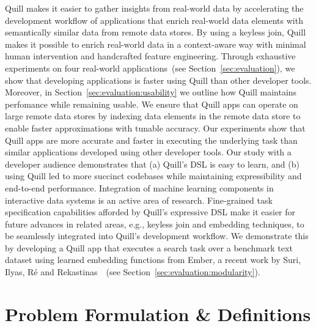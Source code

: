 \documentclass[11pt]{article}
\begin{document}
Quill makes it easier to gather insights from real-world data by accelerating the development workflow of applications that enrich real-world data elements with semantically similar data from remote data stores. By using a keyless join, Quill makes it possible to enrich real-world data in a context-aware way with minimal human intervention and handcrafted feature engineering. Through exhaustive experiments on four real-world applications~(see Section~\ref{sec:evaluation}), we show that developing applications is faster using Quill than other developer tools. Moreover, in Section~\ref{sec:evaluation:usability} we outline how Quill maintains perfomance while remaining usable. We ensure that Quill apps can operate on large remote data stores by indexing data elements in the remote data store to enable faster approximations with tunable accuracy.
Our experiments show that Quill apps are more accurate and faster in executing the underlying task than similar applications developed using other developer tools.
Our study with a developer audience demonstrates that (a) Quill's DSL is easy to learn, and (b) using Quill led to more succinct codebases while maintaining expressibility and end-to-end performance. Integration of machine learning components in interactive data systems is an active area of research. Fine-grained task specification capabilities afforded by Quill's expressive DSL make it easier for future advances in related areas, e.g., keyless join and embedding techniques, to be seamlessly integrated into Quill's development workflow. We demonstrate this by developing a Quill app that executes a search task over a benchmark text dataset using learned embedding functions from Ember, a recent work by Suri, Ilyas, R{\'e} and Rekastinas~\cite{suri2021ember}~(see Section~\ref{sec:evaluation:modularity}).



\section{Problem Formulation \& Definitions}
\label{sec:problem}
\end{document}
